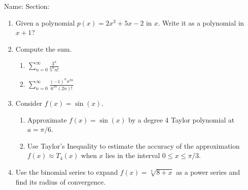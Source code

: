 \documentclass[12pt]{article}
\begin{document}
\noindent Name: \hspace{4in}Section:
\vspace{0.5cm}



\begin{enumerate}
\item Given a polynomial $p(x)=2x^3+5x-2$ in $x$. Write it as a polynomial in $x+1$?
\vfill


\item Compute the sum.
\begin{enumerate}
\item $\sum_{n=0}^{\infty}\frac{3^n}{5^n n!}$
\vfill
\item $\sum_{n=0}^{\infty}\frac{(-1)^n \pi^{2n}}{6^{2n}(2n)!}$
\end{enumerate}
\vfill



\newpage
\item Consider $f(x)=\sin(x)$.
\begin{enumerate}
\item Approximate $f(x)=\sin(x)$ by a degree 4 Taylor polynomial at $a=\pi/6$.
\vfill
\item Use Taylor's Inequality to estimate the accuracy of the approximation $f(x) \approx T_4(x)$ when $x$ lies in the interval $0 \leq x \leq \pi/3$.
\vfill
\end{enumerate}

\item Use the binomial series to expand $f(x)=\sqrt[3]{8+x}$ as a power series and find its radius of convergence.
\vfill


\end{enumerate}
\end{document}
